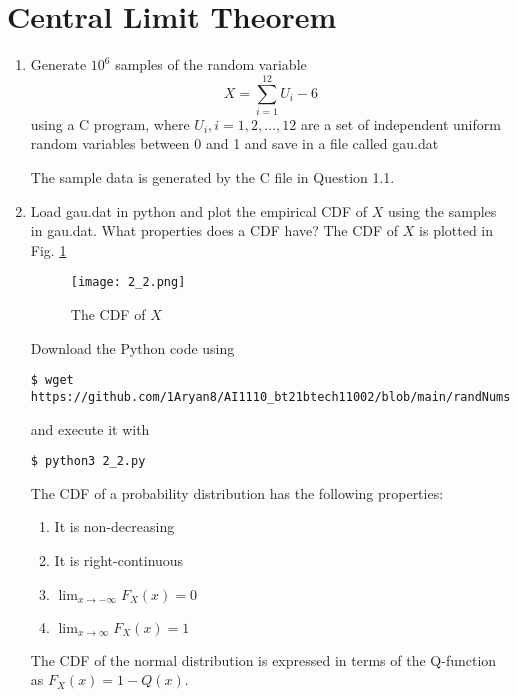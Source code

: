 \documentclass[journal,12pt,twocolumn]{IEEEtran}
\renewcommand\thesection{\arabic{section}}
\begin{document}
\section{Central Limit Theorem}
%
\begin{enumerate}[label=\thesection.\arabic*
,ref=\thesection.\theenumi]
%
\item
Generate $10^6$ samples of the random variable
%
\begin{equation}
X = \sum_{i=1}^{12}U_i -6
\end{equation}
%
using a C program, where $U_i, i = 1,2,\dots, 12$ are  a set of independent uniform random variables between 0 and 1
and save in a file called gau.dat

\solution
The sample data is generated by the C file in Question 1.1.
%

\item
Load gau.dat in python and plot the empirical CDF of $X$ using the samples in gau.dat. What properties does a CDF have?
\solution The CDF of $X$ is plotted in Fig. \ref{fig:gauss_cdf}
\begin{figure}[!htb]
\centering
\texttt{[image: 2\_2.png]}
\caption{The CDF of $X$}
\label{fig:gauss_cdf}
\end{figure}
Download the Python code using
\begin{lstlisting}
$ wget https://github.com/1Aryan8/AI1110_bt21btech11002/blob/main/randNums(sim)/codes/2_2.py
\end{lstlisting}
and execute it with
\begin{lstlisting}
$ python3 2_2.py
\end{lstlisting}
The CDF of a probability distribution has the following properties:
		\begin{enumerate}
			\item It is non-decreasing
			\item It is right-continuous
			\item $\lim_{x \to -\infty}F_X(x) = 0$
			\item $\lim_{x \to \infty}F_X(x) = 1$
		\end{enumerate}
The CDF of the normal distribution is expressed in terms of the Q-function as $F_X(x) = 1 - Q(x)$.


\end{enumerate}
\end{document}
